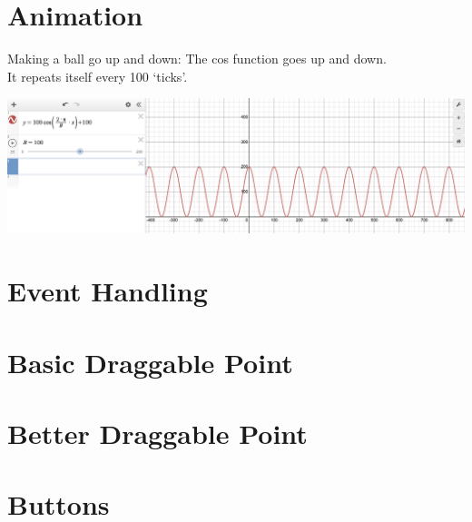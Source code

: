 \documentclass[a4paper,12pt]{article}
\begin{document}
\section{Animation}
Making a ball go up and down:
The cos function goes up and down.\\
It repeats itself every 100 `ticks'.
\begin{center}
	\includegraphics[width=18cm, angle=0, origin=c]{newobjects_animation/cos_graph.png}
\end{center}

\section{Event Handling}
\section{Basic Draggable Point}

\section{Better Draggable Point}





\section{Buttons}
\end{document}

